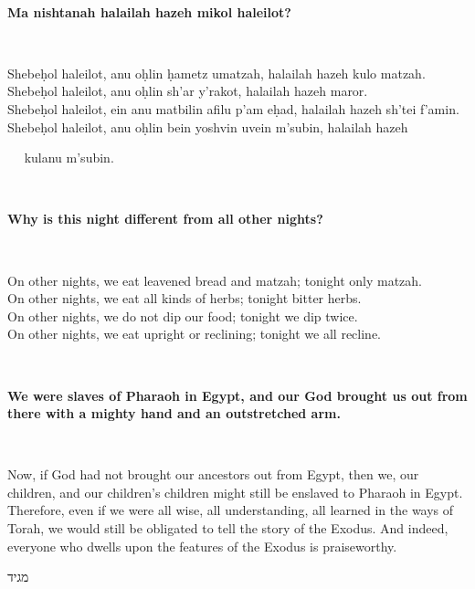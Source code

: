 \documentclass[a4paper,10pt,openany]{memoir}
\newcommand{\HgInst}[1]{{\noindent\sffamily{\bfseries{#1}}}}
\newcommand{\hchapter}[1]{
  \begin{hebrew}
    \begin{Spacing}{.97}
      \newpage
      \strut

      \vspace{.15em}

      \noindent\Huge #1

      \vspace{1em}
    \end{Spacing}
  \end{hebrew}
}
\newcommand{\HgHL}[1]{{\Large\bfseries#1\par\noindent\\[-.5em]}}
\newenvironment{HgEnglish}{\strut\\\noindent}{\vspace{1em}}
\newenvironment{HgTranslit}{\strut\\\noindent\begin{itshape}}{\end{itshape}\vspace{1em}}
\begin{document}
\begin{HgTranslit}
  \HgHL{Ma nishtanah halailah hazeh mikol haleilot?}
  Shebe\d{h}ol haleilot, anu o\d{h}lin \d{h}ametz umatzah, 
  halailah hazeh kulo matzah. \\
  Shebe\d{h}ol haleilot, anu o\d{h}lin sh'ar y'rakot, 
  halailah hazeh maror. \\
  Shebe\d{h}ol haleilot, ein anu matbilin afilu p'am e\d{h}ad,
  halailah hazeh sh'tei f'amin. \\
  Shebe\d{h}ol haleilot, anu o\d{h}lin bein yoshvin uvein m'subin,
  halailah hazeh \\ \strut $\quad$ kulanu m'subin.
\end{HgTranslit}

\begin{HgEnglish}
  \HgHL{Why is this night different from all other nights?}
  On other nights, we eat leavened bread and matzah; tonight only matzah. \\
  On other nights, we eat all kinds of herbs; tonight bitter herbs. \\
  On other nights, we do not dip our food; tonight we dip twice. \\
  On other nights, we eat upright or reclining; tonight we all recline. \\
\end{HgEnglish}

\HgInst{Uncover the matzah, and read:}

\begin{HgEnglish}
\HgHL{We were slaves of Pharaoh in Egypt, and our God brought us out from there
with a mighty hand and an outstretched arm.}
Now, if God had not brought our ancestors out from Egypt, then we, our
children, and our children's children might still be enslaved to Pharaoh in
Egypt.  Therefore, even if we were all wise, all understanding, all learned in
the ways of Torah, we would still be obligated to tell the story of the Exodus.
And indeed, everyone who dwells upon the features of the Exodus is
praiseworthy.
\end{HgEnglish}

\vfill

\hchapter{מגיד}

\vfill
\end{document}

